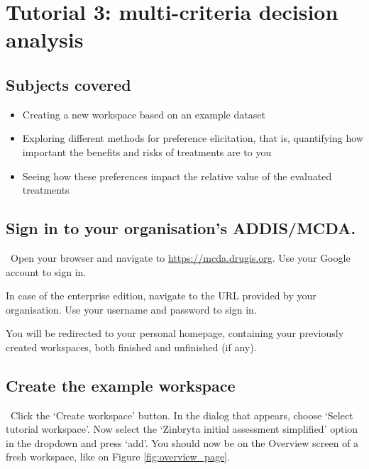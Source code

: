 \documentclass[00_mcda_tutorial.tex]{subfiles}
\begin{document}
\section*{Tutorial 3: multi-criteria decision analysis}
\addtocounter{section}{1}

\subsection*{Subjects covered}
\begin{itemize}
  \item Creating a new workspace based on an example dataset
  \item Exploring different methods for preference elicitation, that is, quantifying how important the benefits and risks of treatments are to you
  \item Seeing how these preferences impact the relative value of the evaluated treatments
\end{itemize}


\subsection*{Sign in to your organisation's ADDIS/MCDA.}
\leftpointright \, Open your browser and navigate to \href{https://mcda.drugis.org}{https://mcda.drugis.org}.
Use your Google account to sign in.

\begin{sidebar*}
In case of the enterprise edition, navigate to the URL provided by your organisation. Use your username and password to sign in.
\end{sidebar*}

You will be redirected to your personal homepage, containing your previously created workspaces, both finished and unfinished (if any).

\subsection*{Create the example workspace}
\leftpointright \, Click the ‘Create workspace’ button. In the dialog that appears, choose ‘Select tutorial workspace’. Now select the ‘Zinbryta initial assessment simplified’ option in the dropdown and press ‘add’. You should now be on the Overview screen of a fresh workspace, like on Figure \ref{fig:overview_page}.
\newline
\end{document}
